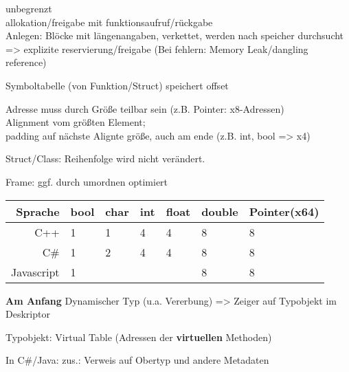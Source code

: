  unbegrenzt\\
 allokation/freigabe mit funktionsaufruf/rückgabe\\
 Anlegen: Blöcke mit längenangaben, verkettet, werden nach speicher durchsucht\\
=> explizite reservierung/freigabe (Bei fehlern: Memory Leak/dangling reference)

 Symboltabelle (von Funktion/Struct) speichert offset

 Adresse muss durch Größe teilbar sein (z.B. Pointer: x8-Adressen)\\
 Alignment vom größten Element; \\padding auf nächste Alignte größe, auch am ende (z.B. {int, bool} => x4) 

Struct/Class: Reihenfolge wird nicht verändert.

Frame: ggf. durch umordnen optimiert

\begin{tabular}{|r|l|l|l|l|l|l|}
\hline
Sprache & bool & char & int & float & double & Pointer(x64) \\ 
\hline
C++ & 1&1 & 4 &4&8&8\\
\hline
C\# & 1&2 & 4 &4&8&8\\
\hline
Javascript & 1 &&&&8&8\\
\hline
\end{tabular}

\textbf{Am Anfang}
Dynamischer Typ (u.a. Vererbung) => Zeiger auf Typobjekt im Deskriptor

Typobjekt: Virtual Table (Adressen der \textbf{virtuellen} Methoden)

In C\#/Java: zus.: Verweis auf Obertyp und andere Metadaten
